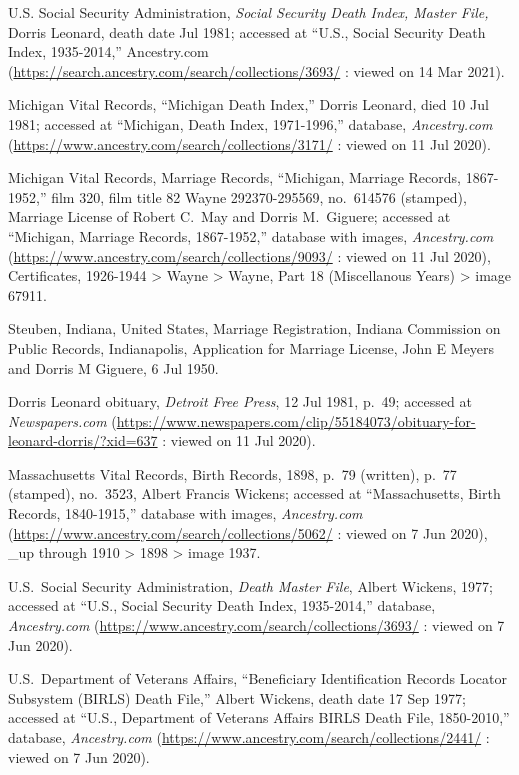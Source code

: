 \begin{thebibliography}{999}
U.S. Social Security Administration, \textit{Social Security Death Index, Master File,} Dorris Leonard, death date Jul 1981; accessed at ``U.S., Social Security Death Index, 1935-2014,'' Ancestry.com (\url{https://search.ancestry.com/search/collections/3693/} : viewed on 14 Mar 2021).

Michigan Vital Records, ``Michigan Death Index,'' Dorris Leonard, died 10 Jul 1981; accessed at ``Michigan, Death Index, 1971-1996,'' database, \textit{Ancestry.com} (\url{https://www.ancestry.com/search/collections/3171/} : viewed on 11 Jul 2020).

Michigan Vital Records, Marriage Records, ``Michigan, Marriage Records, 1867-1952,'' film 320, film title 82 Wayne 292370-295569, no.\ 614576 (stamped), Marriage License of Robert C.\ May and Dorris M.\ Giguere; accessed at ``Michigan, Marriage Records, 1867-1952,'' database with images, \textit{Ancestry.com} (\url{https://www.ancestry.com/search/collections/9093/} : viewed on 11 Jul 2020), Certificates, 1926-1944 > Wayne > Wayne, Part 18 (Miscellanous Years) > image 67911.

Steuben, Indiana, United States, Marriage Registration, Indiana Commission on Public Records, Indianapolis, Application for Marriage License, John E Meyers and Dorris M Giguere, 6 Jul 1950.

Dorris Leonard obituary, \textit{Detroit Free Press}, 12 Jul 1981, p.\ 49; accessed at \textit{Newspapers.com} (\url{https://www.newspapers.com/clip/55184073/obituary-for-leonard-dorris/?xid=637} : viewed on 11 Jul 2020).


Massachusetts Vital Records, Birth Records, 1898, p.\ 79 (written), p.\ 77 (stamped), no.\ 3523, Albert Francis Wickens; accessed at ``Massachusetts, Birth Records, 1840-1915,'' database with images, \textit{Ancestry.com} (\url{https://www.ancestry.com/search/collections/5062/} : viewed on 7 Jun 2020), \_up through 1910 > 1898 > image 1937.

U.S.\ Social Security Administration, \textit{Death Master File}, Albert Wickens, 1977; accessed at ``U.S., Social Security Death Index, 1935-2014,'' database, \textit{Ancestry.com} (\url{https://www.ancestry.com/search/collections/3693/} : viewed on 7 Jun 2020).

U.S.\ Department of Veterans Affairs, ``Beneficiary Identification Records Locator Subsystem (BIRLS) Death File,'' Albert Wickens, death date 17 Sep 1977; accessed at ``U.S., Department of Veterans Affairs BIRLS Death File, 1850-2010,'' database, \textit{Ancestry.com} (\url{https://www.ancestry.com/search/collections/2441/} : viewed on 7 Jun 2020).


\end{thebibliography}
